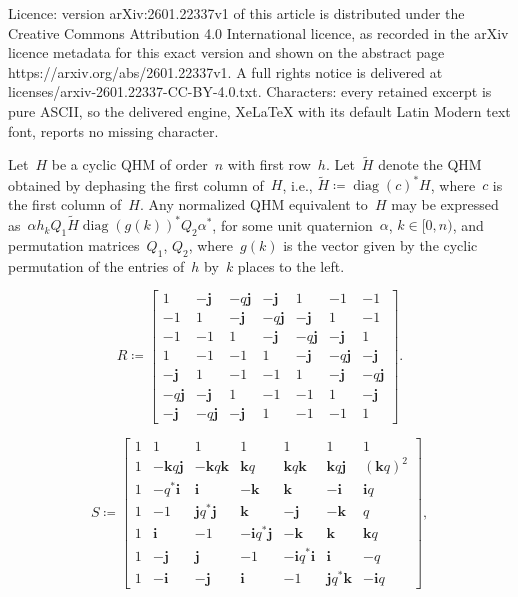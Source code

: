 \documentclass[10pt,a4paper]{amsart}
\DeclareMathOperator{\diag}{diag}
\newcommand{\adjoint}{*}
\newcommand{\eqdef}{\coloneqq}
\newcommand{\qi}{\mathbf{i}}
\newcommand{\qj}{\mathbf{j}}
\newcommand{\qk}{\mathbf{k}}
\newcommand{\tH}{\widetilde{H}}
\begin{document}
Licence: version arXiv:2601.22337v1 of this article is distributed under the Creative Commons Attribution 4.0 International licence, as recorded in the arXiv licence metadata for this exact version and shown on the abstract page https://arxiv.org/abs/2601.22337v1. A full rights notice is delivered at licenses/arxiv-2601.22337-CC-BY-4.0.txt. Characters: every retained excerpt is pure ASCII, so the delivered engine, XeLaTeX with its default Latin Modern text font, reports no missing character.
\begin{lemma}
\label{lem-eq-cyclic-qhm}
Let\/~$H$ be a cyclic QHM of order\/~$n$ with first row\/~$h$. Let\/~$\tH$ denote the QHM obtained by dephasing the first column of\/~$H$, i.e., $\tH \eqdef \diag(c)^\adjoint H$, where\/~$c$ is the first column of\/~$H$. Any normalized QHM equivalent to\/~$H$ may be expressed as\/~$\alpha h_k Q_1 \tH \diag(g(k))^\adjoint Q_2 \alpha^*$, for some unit quaternion\/~$\alpha$, $k \in [0,n)$, and permutation matrices\/~$Q_1$, $Q_2$, where\/~$g(k)$ is the vector given by the cyclic permutation of the entries of\/~$h$ by\/~$k$ places to the left. 
\end{lemma}

\begin{equation}
\label{eq-o7qhm}
R \eqdef
\begin{bmatrix}
 1 & -\qj & -q \qj & -\qj & 1 & -1 & -1 \\
-1 & 1 & -\qj & - q \qj & -\qj & 1 & -1 \\
-1 & -1 & 1 & -\qj & - q \qj & -\qj & 1 \\
 1 & -1 & -1 & 1 & -\qj & - q \qj & -\qj \\
-\qj & 1 & -1 & -1 & 1 & -\qj & - q \qj \\
- q \qj & -\qj & 1 & -1 & -1 & 1 & -\qj \\
-\qj & - q \qj & -\qj & 1 & -1 & -1 & 1 
\end{bmatrix} .
\end{equation}

\begin{equation}
\label{eq-o7qhm-k10}
S \eqdef
\begin{bmatrix}
1 & 1 & 1 & 1 & 1 & 1 & 1 \\
1 & -\qk q \qj & -\qk q \qk & \qk q & \qk q \qk & \qk q \qj & (\qk q)^2 \\
1 & -q^* \qi & \qi & -\qk & \qk & -\qi & \qi q \\
1 & -1 & \qj q^* \qj & \qk & -\qj & -\qk & q \\
1 & \qi & -1 & -\qi q^* \qj & -\qk & \qk & \qk q \\
1 & -\qj & \qj & -1 & -\qi q^* \qi & \qi & -q \\ 
1 & -\qi & -\qj & \qi & -1 & \qj q^* \qk & -\qi q 
\end{bmatrix} ,
\end{equation}
\end{document}
